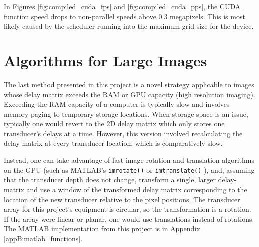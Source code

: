     In Figures \ref{fig:compiled_cuda_fps} and \ref{fig:compiled_cuda_pps}, the CUDA function speed drops to non-parallel speeds above 0.3 megapixels. This is most likely caused by the scheduler running into the maximum grid size for the device.

\section{Algorithms for Large Images}
\label{chapter3:Large_Images}

    The last method presented in this project is a novel strategy applicable to images whose delay matrix exceeds the RAM or GPU capacity (high resolution imaging). Exceeding the RAM capacity of a computer is typically slow and involves memory paging \cite{ResolveOutMemory} \cite{PagingOperatingSystem2016} to temporary storage locations. When storage space is an issue, typically one would revert to the 2D delay matrix which only stores one transducer's delays at a time. However, this version involved recalculating the delay matrix at every transducer location, which is comparatively slow.

    Instead, one can take advantage of fast image rotation and translation algorithms on the GPU (such as MATLAB's \lstinline[style = MATLAB-editor]{imrotate()} \cite{RotateImageMATLAB} or \lstinline[style = MATLAB-editor]{imtranslate()} \cite{TranslateImageMATLAB}), and, assuming that the transducer depth does not change, transform a single, larger delay-matrix and use a window of the transformed delay matrix corresponding to the location of the new transducer relative to the pixel positions. The transducer array for this project's equipment is circular, so the transformation is a rotation. If the array were linear or planar, one would use translations instead of rotations. The MATLAB implementation from this project is in Appendix \ref{appB:matlab_functions}.

